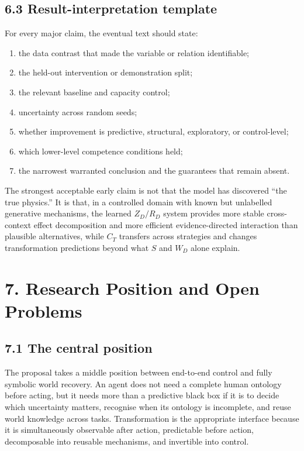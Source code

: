 \documentclass[11pt]{article}
\begin{document}
\subsection*{6.3 Result-interpretation template}

For every major claim, the eventual text should state:

\begin{enumerate}
\item the data contrast that made the variable or relation identifiable;
\item the held-out intervention or demonstration split;
\item the relevant baseline and capacity control;
\item uncertainty across random seeds;
\item whether improvement is predictive, structural, exploratory, or control-level;
\item which lower-level competence conditions held;
\item the narrowest warranted conclusion and the guarantees that remain absent.
\end{enumerate}

The strongest acceptable early claim is not that the model has discovered ``the true physics.'' It is that, in a controlled domain
with known but unlabelled generative mechanisms, the learned $Z_D/R_D$ system provides more stable cross-context effect decomposition
and more efficient evidence-directed interaction than plausible alternatives, while $C_T$ transfers across strategies and changes
transformation predictions beyond what $S$ and $W_D$ alone explain.

\section*{7. Research Position and Open Problems}

\subsection*{7.1 The central position}

The proposal takes a middle position between end-to-end control and fully symbolic world recovery. An agent does not need a complete
human ontology before acting, but it needs more than a predictive black box if it is to decide which uncertainty matters, recognise
when its ontology is incomplete, and reuse world knowledge across tasks. Transformation is the appropriate interface because it is
simultaneously observable after action, predictable before action, decomposable into reusable mechanisms, and invertible into control.
\end{document}
